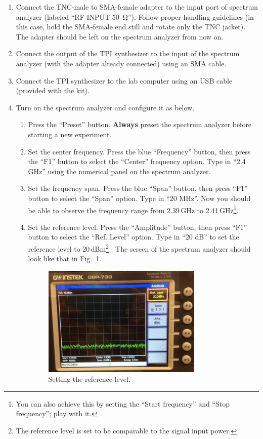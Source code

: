 \documentclass[letterpaper, 11pt]{article}
\begin{document}
\begin{enumerate}
	\item Connect the TNC-male to SMA-female adapter to the input port of spectrum analyzer (labeled ``RF INPUT \SI{50}{\ohm}''). Follow proper handling guidelines (in this case, hold the SMA-female end still and rotate only the TNC jacket). The adapter should be left on the spectrum analyzer from now on. 
	
	\item Connect the output of the TPI synthesizer to the input of the spectrum analyzer (with the adapter already connected) using an SMA cable.
	
	\item Connect the TPI synthesizer to the lab computer using an USB cable (provided with the kit).
	
	\item Turn on the spectrum analyzer and configure it as below.
		\begin{enumerate}
			\item Press the ``Preset'' button. \textbf{Always} preset the spectrum analyzer before starting a new experiment.
			
			\item Set the center frequency. Press the blue ``Frequency'' button, then press the ``F1'' button to select the ``Center'' frequency option. Type in ``2.4 GHz'' using the numerical panel on the spectrum analyzer. 
			
			\item Set the frequency span.  Press the blue ``Span'' button, then press ``F1'' button to select the ``Span'' option. Type in ``20 MHz''. Now you should be able to observe the frequency range from 2.39\,GHz to 2.41\,GHz\footnote{You can also achieve this by setting the ``Start frequency'' and ``Stop frequency''; play with it.}. 
			
			\item Set the reference level. Press the ``Amplitude'' button, then press ``F1'' button to select the ``Ref. Level'' option. Type in ``20 dB'' to set the reference level to 20\,dBm\footnote{The reference level is set to be comparable to the signal input power.} . The screen of the spectrum analyzer should look like that in Fig.~\ref{fig:sa-reference}. 
				\begin{figure}[h]
					\centering
					\includegraphics[width=3in]{sa-reference}
					\caption{Setting the reference level.}
					\label{fig:sa-reference}
				\end{figure}
		\end{enumerate}
		

\end{enumerate}
\end{document}
